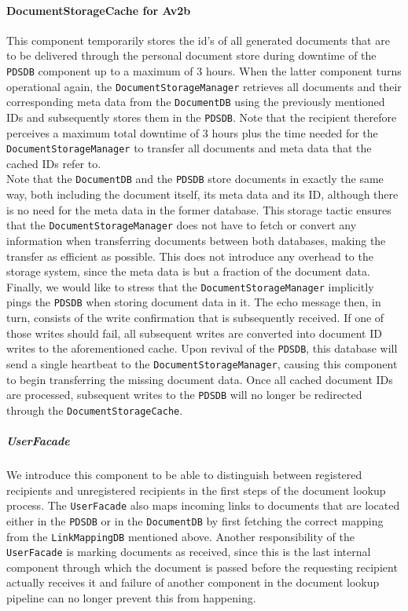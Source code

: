 \documentclass[a4paper,10pt]{article}
\begin{document}
\paragraph{DocumentStorageCache for Av2b}
This component temporarily stores the id's of all generated documents that are to be delivered through the personal document store during downtime of the \texttt{PDSDB} component up to a maximum of 3 hours. When the latter component turns operational again, the \texttt{DocumentStorageManager} retrieves all documents and their corresponding meta data from the \texttt{DocumentDB} using the previously mentioned IDs and subsequently stores them in the \texttt{PDSDB}. Note that the recipient therefore perceives a maximum total downtime of 3 hours plus the time needed for the \texttt{DocumentStorageManager} to transfer all documents and meta data that the cached IDs refer to. \\
Note that the \texttt{DocumentDB} and the \texttt{PDSDB} store documents in exactly the same way, both including the document itself, its meta data and its ID, although there is no need for the meta data in the former database. This storage tactic ensures that the \texttt{DocumentStorageManager} does not have to fetch or convert any information when transferring documents between both databases, making the transfer as efficient as possible. This does not introduce any overhead to the storage system, since the meta data is but a fraction of the document data. \\
Finally, we would like to stress that the \texttt{DocumentStorageManager} implicitly pings the \texttt{PDSDB} when storing document data in it. The echo message then, in turn, consists of the write confirmation that is subsequently received. If one of those writes should fail, all subsequent writes are converted into document ID writes to the aforementioned cache. Upon revival of the \texttt{PDSDB}, this database will send a single heartbeat to the \texttt{DocumentStorageManager}, causing this component to begin transferring the missing document data. Once all cached document IDs are processed, subsequent writes to the \texttt{PDSDB} will no longer be redirected through the \texttt{DocumentStorageCache}.

\subparagraph{UserFacade}
We introduce this component to be able to distinguish between registered recipients and unregistered recipients in the first steps of the document lookup process. The \texttt{UserFacade} also maps incoming links to documents that are located either in the \texttt{PDSDB} or in the \texttt{DocumentDB} by first fetching the correct mapping from the \texttt{LinkMappingDB} mentioned above. Another responsibility of the \texttt{UserFacade} is marking documents as received, since this is the last internal component through which the document is passed before the requesting recipient actually receives it and failure of another component in the document lookup pipeline can no longer prevent this from happening.
\end{document}
